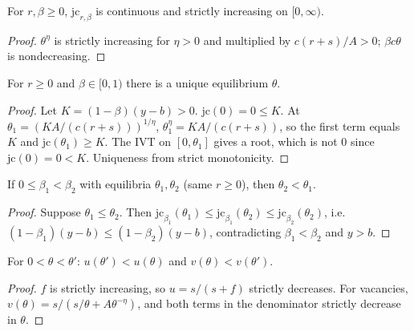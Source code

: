 \begin{lemma}
\label{lem:dmp_jc_mono}
\leanok
{}
For $r, \beta \ge 0$, $\mathrm{jc}_{r,\beta}$ is continuous and strictly increasing on $[0, \infty)$.
\end{lemma}
\begin{proof}
\leanok
$\theta^\eta$ is strictly increasing for $\eta > 0$ and multiplied by $c(r+s)/A > 0$; $\beta c\theta$ is nondecreasing.
\end{proof}

\begin{theorem}
\label{thm:dmp_existsUnique}
\leanok
{}
For $r \ge 0$ and $\beta \in [0, 1)$ there is a unique equilibrium $\theta$.
\end{theorem}
\begin{proof}
\leanok
Let $K = (1-\beta)(y - b) > 0$. $\mathrm{jc}(0) = 0 \le K$. At
$\theta_1 = (KA/(c(r+s)))^{1/\eta}$, $\theta_1^\eta = KA/(c(r+s))$, so the first term equals $K$ and
$\mathrm{jc}(\theta_1) \ge K$. The IVT on $[0, \theta_1]$ gives a root, which is not $0$ since $\mathrm{jc}(0) = 0 < K$.
Uniqueness from strict monotonicity.
\end{proof}

\begin{theorem}
\label{thm:dmp_strictAnti_beta}
\leanok
{}
If $0 \le \beta_1 < \beta_2$ with equilibria $\theta_1, \theta_2$ (same $r \ge 0$), then $\theta_2 < \theta_1$.
\end{theorem}
\begin{proof}
\leanok
Suppose $\theta_1 \le \theta_2$. Then $\mathrm{jc}_{\beta_1}(\theta_1) \le \mathrm{jc}_{\beta_1}(\theta_2) \le \mathrm{jc}_{\beta_2}(\theta_2)$,
i.e.\ $(1-\beta_1)(y-b) \le (1-\beta_2)(y-b)$, contradicting $\beta_1 < \beta_2$ and $y > b$.
\end{proof}

\begin{theorem}
\label{thm:beveridge}
\leanok
{}
For $0 < \theta < \theta'$: $u(\theta') < u(\theta)$ and $v(\theta) < v(\theta')$.
\end{theorem}
\begin{proof}
\leanok
$f$ is strictly increasing, so $u = s/(s+f)$ strictly decreases. For vacancies,
$v(\theta) = s/(s/\theta + A\theta^{-\eta})$, and both terms in the denominator strictly decrease in $\theta$.
\end{proof}

